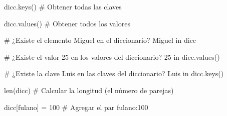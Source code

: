 \documentclass[
  letterpaper,
  DIV=11,
  numbers=noendperiod]{scrreprt}
\newenvironment{Shaded}{\begin{snugshade}}{\end{snugshade}}
\newcommand{\BuiltInTok}[1]{\textcolor[rgb]{0.00,0.23,0.31}{#1}}
\newcommand{\CommentTok}[1]{\textcolor[rgb]{0.37,0.37,0.37}{#1}}
\newcommand{\DecValTok}[1]{\textcolor[rgb]{0.68,0.00,0.00}{#1}}
\newcommand{\KeywordTok}[1]{\textcolor[rgb]{0.00,0.23,0.31}{#1}}
\newcommand{\NormalTok}[1]{\textcolor[rgb]{0.00,0.23,0.31}{#1}}
\newcommand{\OperatorTok}[1]{\textcolor[rgb]{0.37,0.37,0.37}{#1}}
\newcommand{\StringTok}[1]{\textcolor[rgb]{0.13,0.47,0.30}{#1}}
\begin{document}
\begin{Shaded}
\begin{Highlighting}[]
\NormalTok{dicc.keys() }\CommentTok{\# Obtener todas las claves}
\end{Highlighting}
\end{Shaded}

\begin{Shaded}
\begin{Highlighting}[]
\NormalTok{dicc.values() }\CommentTok{\# Obtener todos los valores}
\end{Highlighting}
\end{Shaded}

\begin{Shaded}
\begin{Highlighting}[]
\CommentTok{\# ¿Existe el elemento \textquotesingle{}Miguel\textquotesingle{} en el diccionario?}
\CommentTok{\textquotesingle{}Miguel\textquotesingle{}} \KeywordTok{in}\NormalTok{ dicc}
\end{Highlighting}
\end{Shaded}

\begin{Shaded}
\begin{Highlighting}[]
\CommentTok{\# ¿Existe el valor 25 en los valores del diccionario?}
\DecValTok{25} \KeywordTok{in}\NormalTok{ dicc.values()}
\end{Highlighting}
\end{Shaded}

\begin{Shaded}
\begin{Highlighting}[]
\CommentTok{\# ¿Existe la clave \textquotesingle{}Luis\textquotesingle{} en las claves del diccionario?}
\CommentTok{\textquotesingle{}Luis\textquotesingle{}} \KeywordTok{in}\NormalTok{ dicc.keys()}
\end{Highlighting}
\end{Shaded}

\begin{Shaded}
\begin{Highlighting}[]
\BuiltInTok{len}\NormalTok{(dicc) }\CommentTok{\# Calcular la longitud (el número de parejas)}
\end{Highlighting}
\end{Shaded}

\begin{Shaded}
\begin{Highlighting}[]
\NormalTok{dicc[}\StringTok{\textquotesingle{}fulano\textquotesingle{}}\NormalTok{] }\OperatorTok{=} \DecValTok{100} \CommentTok{\# Agregar el par \textasciigrave{}\textquotesingle{}fulano\textquotesingle{}:100\textasciigrave{}}
\end{Highlighting}
\end{Shaded}
\end{document}
